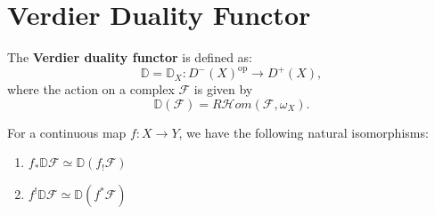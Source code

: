 \section{Verdier Duality Functor}

\begin{definition}
The \textbf{Verdier duality functor} is defined as:
\begin{equation*}
    \mathbb{D} = \mathbb{D}_X \colon D^-(X)^{\text{op}} \longrightarrow D^+(X),
\end{equation*}
where the action on a complex $\mathcal{F}$ is given by
\begin{equation*}
    \mathbb{D}(\mathcal{F}) = R\mathcal{H}om(\mathcal{F}, \omega_X).
\end{equation*}
\end{definition}

\begin{lemma}
For a continuous map $f \colon X \to Y$, we have the following natural isomorphisms:
\begin{enumerate}
    \item $f_* \mathbb{D}\mathcal{F} \simeq \mathbb{D}(f_! \mathcal{F})$
    \item $f^! \mathbb{D}\mathcal{F} \simeq \mathbb{D}(f^* \mathcal{F})$
\end{enumerate}
\end{lemma}

